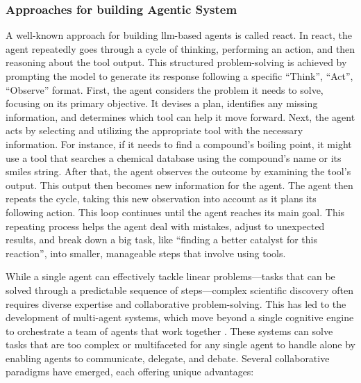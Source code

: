 \subsubsection{Approaches for building Agentic System}

A well-known approach for building \gls{llm}-based agents is called \gls{react}\autocite{yao2023react}. In \gls{react}, the agent repeatedly goes through a cycle of thinking, performing an action, and then reasoning about the tool output. 
This structured problem-solving is achieved by prompting the model to generate its response following a specific \enquote{Think}, \enquote{Act}, \enquote{Observe} format.
First, the agent considers the problem it needs to solve, focusing on its primary objective. It devises a plan, identifies any missing information, and determines which tool can help it move forward. Next, the agent acts by selecting and utilizing the appropriate tool with the necessary information. For instance, if it needs to find a compound's boiling point, it might use a tool that searches a chemical database using the compound's name or its \gls{smiles} string. After that, the agent observes the outcome by examining the tool's output. This output then becomes new information for the agent. The agent then repeats the cycle, taking this new observation into account as it plans its following action. This loop continues until the agent reaches its main goal. This repeating process helps the agent deal with mistakes, adjust to unexpected results, and break down a big task, like \enquote{finding a better catalyst for this reaction}, into smaller, manageable steps that involve using tools.

While a single agent can effectively tackle linear problems---tasks that can be solved through a predictable sequence of steps---complex scientific discovery often requires diverse expertise and collaborative problem-solving. This has led to the development of multi-agent systems, which move beyond a single cognitive engine to orchestrate a team of agents that work together \autocite{wu2023autogen}. These systems can solve tasks that are too complex or multifaceted for any single agent to handle alone by enabling agents to communicate, delegate, and debate. \autocite{lazaridou2020emergent}
Several collaborative paradigms have emerged, each offering unique advantages:

